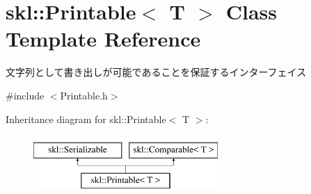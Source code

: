 \hypertarget{classskl_1_1_printable}{}\section{skl\+:\+:Printable$<$ T $>$ Class Template Reference}
\label{classskl_1_1_printable}


文字列として書き出しが可能であることを保証するインターフェイス  




{\ttfamily \#include $<$Printable.\+h$>$}

Inheritance diagram for skl\+:\+:Printable$<$ T $>$\+:\begin{figure}[H]
\begin{center}
\leavevmode
\includegraphics[height=2.000000cm]{classskl_1_1_printable}
\end{center}
\end{figure}
